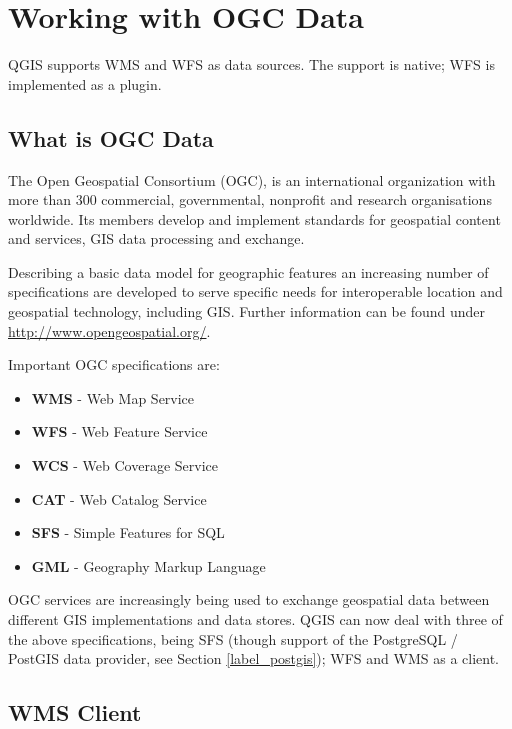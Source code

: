 \section{Working with OGC Data}

QGIS supports WMS and WFS as data sources. The support is native; WFS is
implemented as a plugin.

\subsection{What is OGC Data}

The Open Geospatial Consortium (OGC), is an international organization with more than 300 
commercial, governmental, nonprofit and research organisations worldwide. Its members 
develop and implement standards for geospatial content and services, GIS data processing 
and exchange.

Describing a basic data model for geographic features an increasing number of specifications 
are developed to serve specific needs for interoperable location and geospatial technology, 
including GIS. Further information can be found under \url{http://www.opengeospatial.org/}.

Important OGC specifications are:

\begin{itemize}
\item \textbf{WMS} - Web Map Service
\item \textbf{WFS} - Web Feature Service
\item \textbf{WCS} - Web Coverage Service
\item \textbf{CAT} - Web Catalog Service
\item \textbf{SFS} - Simple Features for SQL
\item \textbf{GML} - Geography Markup Language
\end{itemize}

OGC services are increasingly being used to exchange geospatial data between
different GIS implementations and data stores.  QGIS can now deal with three of the
above specifications, being SFS (though support of the PostgreSQL / PostGIS
data provider, see Section \ref{label_postgis}); WFS and WMS as a client.

\subsection{WMS Client}\label{sec:ogc-wms}

